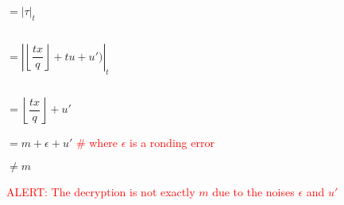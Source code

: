 \begin{enumerate}
$= |\tau|_t$

$ $

$ = \left|\left\lfloor\dfrac{tx}{q}\right\rfloor + tu + u')\right|_t$

$ $

$ = \left\lfloor\dfrac{tx}{q}\right\rfloor + u'$

$ = m + \epsilon + u'$ \textcolor{red}{ \# where $\epsilon$ is a ronding error}

$ \neq m$

\textcolor{red}{ALERT: The decryption is not exactly $m$ due to the noises $\epsilon$ and $u'$}

\end{enumerate}

\clearpage